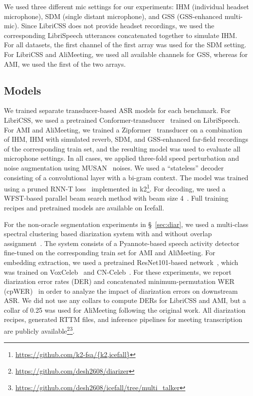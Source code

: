 \documentclass[a4paper]{article}
\begin{document}
We used three different mic settings for our experiments: IHM (individual headset microphone), SDM (single distant microphone), and GSS (GSS-enhanced multi-mic). Since LibriCSS does not provide headset recordings, we used the corresponding LibriSpeech utterances concatenated together to simulate IHM. For all datasets, the first channel of the first array was used for the SDM setting. For LibriCSS and AliMeeting, we used all available channels for GSS, whereas for AMI, we used the first of the two arrays. 

\subsection{Models}

We trained separate transducer-based ASR models for each benchmark. For LibriCSS, we used a pretrained Conformer-transducer~\cite{Gulati2020ConformerCT} trained on LibriSpeech. For AMI and AliMeeting, we trained a Zipformer~\cite{zipformer} transducer on a combination of IHM, IHM with simulated reverb, SDM, and GSS-enhanced far-field recordings of the corresponding train set, and the resulting model was used to evaluate all microphone settings. In all cases, we applied three-fold speed perturbation and noise augmentation using MUSAN~\cite{Snyder2015MUSANAM} noises. We used a ``stateless'' decoder consisting of a convolutional layer with a bi-gram context. The model was trained using a pruned RNN-T loss~\cite{Kuang2022PrunedRF} implemented in k2\footnote{\url{https://github.com/k2-fsa/{k2,icefall}}}. For decoding, we used a WFST-based parallel beam search method with beam size 4~\cite{Kang2022FastAP}. Full training recipes and pretrained models are available on Icefall\footnotemark[\value{footnote}].

For the non-oracle segmentation experiments in \S~\ref{sec:diar}, we used a multi-class spectral clustering based diarization system with and without overlap assignment~\cite{Park2020AutoTuningSC, Raj2020MulticlassSC}. The system consists of a Pyannote-based speech activity detector~\cite{Bredin2021EndtoendSS} fine-tuned on the corresponding train set for AMI and AliMeeting. For embedding extraction, we used a pretrained ResNet101-based network~\cite{Landini2020BayesianHC}, which was trained on VoxCeleb~\cite{Nagrani2017VoxCelebAL,Nagrani2020VoxcelebLS} and CN-Celeb~\cite{Fan2020CNCelebAC}. For these experiments, we report diarization error rates (DER) and concatenated minimum-permutation WER (cpWER)~\cite{Watanabe2020CHiME6CT} in order to analyze the impact of diarization errors on downstream ASR. We did not use any collars to compute DERs for LibriCSS and AMI, but a collar of 0.25 was used for AliMeeting following the original work. All diarization recipes, generated RTTM files, and inference pipelines for meeting transcription are publicly available\footnote{\url{https://github.com/desh2608/diarizer}}\footnote{\url{https://github.com/desh2608/icefall/tree/multi_talker}}.
\end{document}

